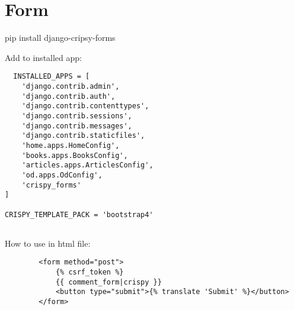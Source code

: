 \chapter{Form}

pip install django-cripsy-forms


Add to installed app:

\begin{lstlisting}
  INSTALLED_APPS = [
    'django.contrib.admin',
    'django.contrib.auth',
    'django.contrib.contenttypes',
    'django.contrib.sessions',
    'django.contrib.messages',
    'django.contrib.staticfiles',
    'home.apps.HomeConfig',
    'books.apps.BooksConfig',
    'articles.apps.ArticlesConfig',
    'od.apps.OdConfig',
    'crispy_forms'
]

CRISPY_TEMPLATE_PACK = 'bootstrap4'
  
\end{lstlisting}



  
How to use in html file:
\begin{lstlisting}
        <form method="post">
            {% csrf_token %}
            {{ comment_form|crispy }}
            <button type="submit">{% translate 'Submit' %}</button>
        </form>  
\end{lstlisting}